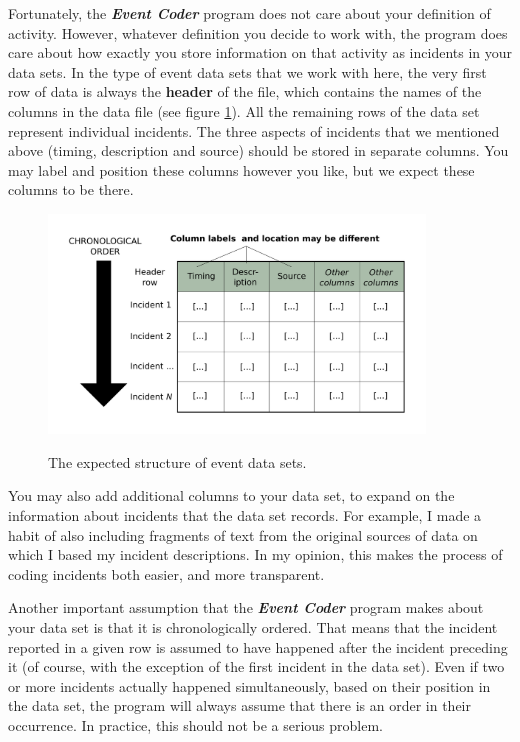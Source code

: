 \documentclass{memoir}
\begin{document}
Fortunately, the \emph{\textbf{Event Coder}} program does not care about your definition of activity. However, whatever definition you decide to work with, the program does care about how exactly you store information on that activity as incidents in your data sets. In the type of event data sets that we work with here, the very first row of data is always the \textbf{header} of the file, which contains the names of the columns in the data file (see figure \ref{fig:datasetstructure}). All the remaining rows of the data set represent individual incidents. The three aspects of incidents that we mentioned above (timing, description and source) should be stored in separate columns. You may label and position these columns however you like, but we expect these columns to be there.

\begin{figure}[h!]
  \centering
  \caption{The expected structure of event data sets.}
  \includegraphics[width=100mm]{Diagram_4.pdf}
  \label{fig:datasetstructure}
\end{figure}

You may also add additional columns to your data set, to expand on the information about incidents that the data set records. For example, I made a habit of also including fragments of text from the original sources of data on which I based my incident descriptions. In my opinion, this makes the process of coding incidents both easier, and more transparent.    

Another important assumption that the \textbf{\emph{Event Coder}} program makes about your data set is that it is chronologically ordered. That means that the incident reported in a given row is assumed to have happened after the incident preceding it (of course, with the exception of the first incident in the data set). Even if two or more incidents actually happened simultaneously, based on their position in the data set, the program will always assume that there is an order in their occurrence. In practice, this should not be a serious problem.
\end{document}
